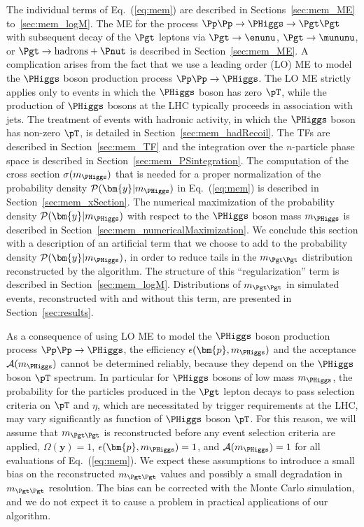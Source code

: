 The individual terms of Eq.~(\ref{eq:mem}) are described in
Sections~\ref{sec:mem_ME} to~\ref{sec:mem_logM}.
The ME for the process $\Pp\Pp \to \PHiggs \to \Pgt\Pgt$
with subsequent decay of the $\Pgt$ leptons 
via $\Pgt \to \enunu$, $\Pgt \to \mununu$, or $\Pgt \to \textrm{hadrons} + \Pnut$
is described in Section~\ref{sec:mem_ME}.
A complication arises from the fact that we use a leading order (LO)
ME to model the $\PHiggs$ boson production process $\Pp\Pp \to
\PHiggs$. The LO ME strictly applies only to events in which the $\PHiggs$ boson has zero $\pT$,
while the production of $\PHiggs$ bosons at the LHC typically
proceeds in association with jets.
The treatment of events with hadronic activity, in which the $\PHiggs$ boson has non-zero $\pT$,
is detailed in Section~\ref{sec:mem_hadRecoil}.
The TFs are described in Section~\ref{sec:mem_TF} and
the integration over the $n$-particle phase space is described in
Section~\ref{sec:mem_PSintegration}.
The computation of the cross section $\sigma(m_{\PHiggs})$ that is needed for a proper normalization of the probability density $\mathcal{P}(\bm{y}|m_{\PHiggs})$
in Eq.~(\ref{eq:mem}) is described in Section~\ref{sec:mem_xSection}.
The numerical maximization of the probability density $\mathcal{P}(\bm{y}|m_{\PHiggs})$
with respect to the $\PHiggs$ boson mass $m_{\PHiggs}$ is described in
Section~\ref{sec:mem_numericalMaximization}.
We conclude this section with a description of an artificial term that we
choose to add to the probability density $\mathcal{P}(\bm{y}|m_{\PHiggs})$, in
order to reduce tails in the $m_{\Pgt\Pgt}$ distribution reconstructed
by the algorithm. The structure of this ``regularization'' term is described in
Section~\ref{sec:mem_logM}.
Distributions of $m_{\Pgt\Pgt}$ in simulated events,
reconstructed with and without this term, are presented in Section~\ref{sec:results}.

As a consequence of using LO ME to model the $\PHiggs$ boson production process $\Pp\Pp \to \PHiggs$,
the efficiency $\epsilon(\bm{p},m_{\PHiggs})$ and the acceptance $\mathcal{A}(m_{\PHiggs})$ cannot be determined reliably,
because they depend on the $\PHiggs$ boson $\pT$ spectrum.
In particular for $\PHiggs$ bosons of low mass $m_{\PHiggs}$,
the probability for the particles produced in the $\Pgt$ lepton decays to pass selection criteria on $\pT$ and $\eta$, 
which are necessitated by trigger requirements at the LHC,
may vary significantly as function of $\PHiggs$ boson $\pT$.
For this reason, we will assume that $m_{\Pgt\Pgt}$ is reconstructed before any event selection criteria are applied,
\ie $\Omega(\bm{y}) = 1$, $\epsilon(\bm{p},m_{\PHiggs}) = 1$, and $\mathcal{A}(m_{\PHiggs}) = 1$
for all evaluations of Eq.~(\ref{eq:mem}).
We expect these assumptions to introduce a small bias on the reconstructed $m_{\Pgt\Pgt}$ values
and possibly a small degradation in $m_{\Pgt\Pgt}$ resolution.
The bias can be corrected with the Monte Carlo simulation, 
and we do not expect it to cause a problem in practical applications of our algorithm.




